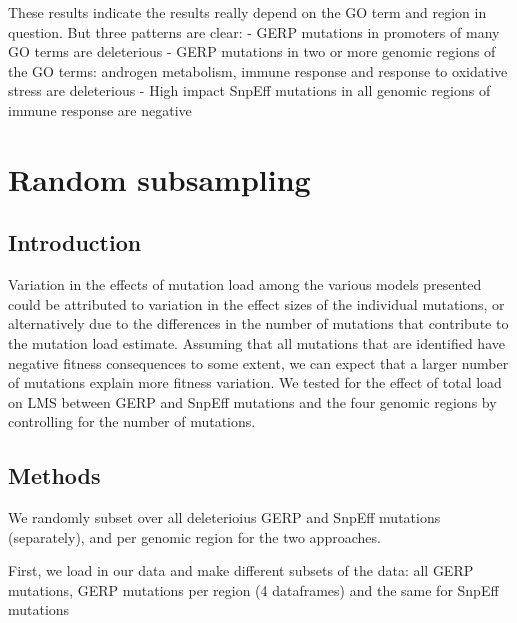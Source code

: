 \documentclass[
  letterpaper,
  DIV=11,
  numbers=noendperiod]{scrreprt}
\begin{document}
These results indicate the results really depend on the GO term and
region in question. But three patterns are clear: - GERP mutations in
promoters of many GO terms are deleterious - GERP mutations in two or
more genomic regions of the GO terms: androgen metabolism, immune
response and response to oxidative stress are deleterious - High impact
SnpEff mutations in all genomic regions of immune response are negative


\chapter{Random subsampling}\label{random-subsampling}

\section{Introduction}\label{introduction-7}

Variation in the effects of mutation load among the various models
presented could be attributed to variation in the effect sizes of the
individual mutations, or alternatively due to the differences in the
number of mutations that contribute to the mutation load estimate.
Assuming that all mutations that are identified have negative fitness
consequences to some extent, we can expect that a larger number of
mutations explain more fitness variation. We tested for the effect of
total load on LMS between GERP and SnpEff mutations and the four genomic
regions by controlling for the number of mutations.

\section{Methods}\label{methods-3}

We randomly subset over all deleterioius GERP and SnpEff mutations
(separately), and per genomic region for the two approaches.

First, we load in our data and make different subsets of the data: all
GERP mutations, GERP mutations per region (4 dataframes) and the same
for SnpEff mutations
\end{document}
